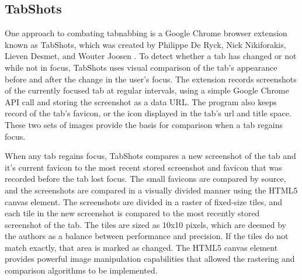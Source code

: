 \documentclass[12pt]{article}
\begin{document}
\begin{doublespace}
\subsection{TabShots}
\begin{comment}
One approach to combating tabnabbing is an extension known as TabShots, a program created by Philippe De Ryck, Nick Nikiforakis, Lieven Desmet, and Wouter Joosen \cite{TabShots}. TabShots continuously takes screenshots of tab and compares them to the previous ones and highlights any changes in red yellow or green depending on how many changes were made. When the user navigates back to a tab that has been altered in a tabnabbing attack, they will see the highlighted portions of the screen and receive a notification that the tab has been altered. 
Performance inpact on larger screens
Relies on user to make decision
\end{comment}

One approach to combating tabnabbing is a Google Chrome browser extension known as TabShots, which was created by Philippe De Ryck, Nick Nikiforakis, Lieven Desmet, and Wouter Joosen \cite{TabShots}.  To detect whether a tab has changed or not while not in focus, TabShots uses visual comparison of the tab's appearance before and after the change in the user's focus.  The extension records screenshots of the currently focused tab at regular intervals, using a simple Google Chrome API call and storing the screenshot as a data URL.  The program also keeps record of the tab's favicon, or the icon displayed in the tab's url and title space.  These two sets of images provide the basis for comparison when a tab regains focus.

When any tab regains focus, TabShots compares a new screenshot of the tab and it's current favicon to the most recent stored screenshot and favicon that was recorded before the tab lost focus.  The small favicons are compared by source, and the screenshots are compared in a visually divided manner using the HTML5 canvas element.  The screenshots are divided in a raster of fixed-size tiles, and each tile in the new screenshot is compared to the most recently stored screenshot of the tab.  The tiles are sized as 10x10 pixels, which are deemed by the authors as a balance between performance and precision.  If the tiles do not match exactly, that area is marked as changed.  The HTML5 canvas element provides powerful image manipulation capabilities that allowed the rastering and comparison algorithms to be implemented.


\end{doublespace}
\end{document}
